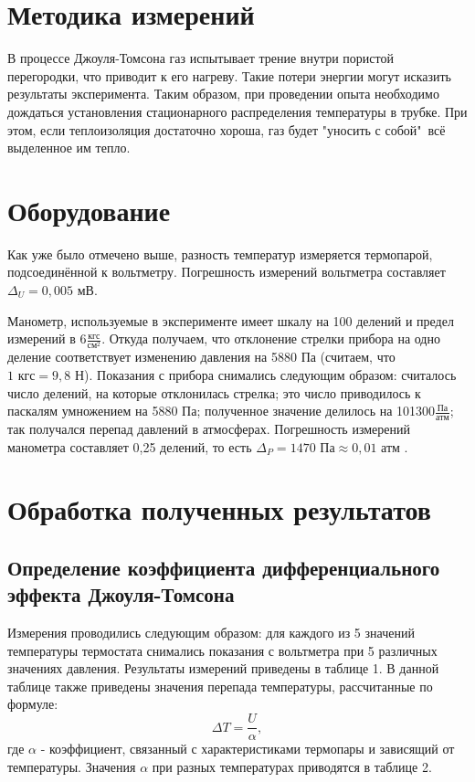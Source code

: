 \documentclass[15pt,a5paper,reqno]{article}
\begin{document}
\section{Методика измерений}	

    В процессе Джоуля-Томсона газ испытывает трение внутри пористой перегородки, что приводит к его нагреву. Такие потери энергии могут исказить результаты эксперимента. Таким образом, при проведении опыта необходимо дождаться установления стационарного распределения температуры в трубке. При этом, если теплоизоляция достаточно хороша, газ будет "уносить с собой"\ всё выделенное им тепло.
    
\section{Оборудование}

    Как уже было отмечено выше, разность температур измеряется термопарой, подсоединённой к вольтметру. Погрешность измерений вольтметра составляет $\Delta_U = 0,005\text{ мВ}$.
    
    Манометр, используемые в эксперименте имеет шкалу на 100 делений и предел измерений в $6\frac{\text{кгс}}{\text{см}^2}$. Откуда получаем, что отклонение стрелки прибора на одно деление соответствует изменению давления на 5880 Па (считаем, что $1\text{ кгс} = 9,8\text{ Н}$). Показания с прибора снимались следующим образом: считалось число делений, на которые отклонилась стрелка; это число приводилось к паскалям умножением на 5880 Па; полученное значение делилось на 101300$\frac{\text{Па}}{\text{атм}}$; так получался перепад давлений в атмосферах. Погрешность измерений манометра составляет 0,25 делений, то есть $\Delta_P = 1470\text{ Па} \approx 0,01\text{ атм}$ .

\section{Обработка полученных результатов}
 
    \subsection{Определение коэффициента дифференциального эффекта Джоуля-Томсона}
    
    Измерения проводились следующим образом: для каждого из 5 значений температуры термостата снимались показания с вольтметра при 5 различных значениях давления. Результаты измерений приведены в таблице 1. В данной таблице также приведены значения перепада температуры, рассчитанные по формуле:
    \[\Delta T = \frac{U}{\alpha},\]
    где $\alpha$ - коэффициент, связанный с характеристиками термопары и зависящий от температуры. Значения $\alpha$ при разных температурах приводятся в таблице 2.
    
\end{document}
